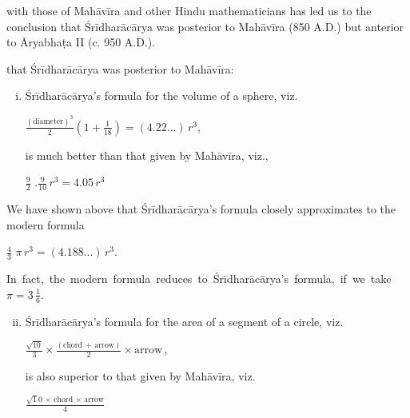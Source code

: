 \documentclass[10pt, openany]{book}
\begin{document}
 \vspace{0.2cm}{A comparative study of the works of Śrīdharācārya}
{with those of Mahāvīra and other Hindu mathematicians has}
{led us to the conclusion that Śrīdharācārya was posterior to}
{Mahāvīra (850 A.D.) but anterior to Āryabhaṭa II (c. 950}
{A.D.).} 

 \vspace{0.3cm}{The following facts revealed by the above study show}
{that Śrīdharācārya was posterior to Mahāvīra:}

\begin{enumerate}[(i)]
    \item {Śrīdharācārya's formula for the volume of a sphere, viz.}

\vspace{0.2cm}
\hspace{8mm} {$\frac {(\textrm{diameter})^3}{2} ({{1} + {\frac{1}{18}}}) = (4.22...)\,r^3$, }

\vspace{0.2cm}
{is much better than that given by Mahāvīra, viz.,}

\vspace{0.2cm}
\hspace{8mm} $\frac{9}{2}$ .$\frac{9}{10}\,r^3 = 4.05\,r^3$ 
\end{enumerate}

{We have shown above that Śrīdharācārya's formula}
{closely approximates to the modern formula}
\vspace{0.2cm}

\hspace{8mm} $\frac{4}{3}$ $\pi\,r^3 = (4.188...)\,r^3.$

\newpage

\englishfont In \,fact, \,the \,modern \,formula \,reduces \,to \,Śrīdharācārya's \,formula, \,if \,we \,take $\pi = 3\,\frac{1}{6}$.

\begin{enumerate}[(i)]
  \setcounter{enumi}{1}
    \item {Śrīdharācārya's formula for the area of a segment} 
{of a circle, viz.}

\vspace{0.2cm}
\hspace{8mm} ${\frac{\sqrt{10}}{3}\times {\frac{(\textrm{chord} \,+\, \textrm{arrow})}{2}}\times \textrm{arrow}}$\,,

{is also superior to that given by Mahāvīra, viz.} 

\vspace{0.2cm}
\hspace{8mm} ${\frac{{\sqrt10} \,\times \,\textrm{chord} \,\times \,\textrm{arrow}}{4}}$
\end{enumerate}
\end{document}
